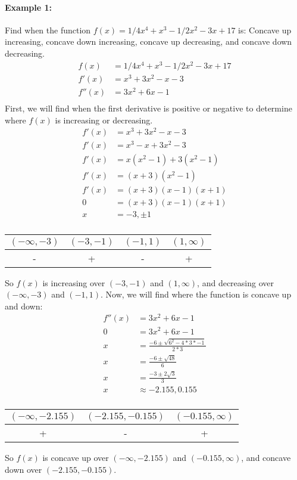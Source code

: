 \documentclass[../revisedmain.tex]{subfiles}
\begin{document}
\paragraph{Example 1:} Find when the function \(f(x)=1/4x^4+x^3-1/2x^2-3x+17\) is: Concave up increasing, concave down increasing, concave up decreasing, and concave down decreasing.
\begin{equation}
	\begin{split}
	f(x)&=1/4x^4+x^3-1/2x^2-3x+17\\
	f'(x)&=x^3+3x^2-x-3\\
	f''(x)&=3x^2+6x-1 \\
	\end{split}
\end{equation}First, we will find when the first derivative is positive or negative to determine where \(f(x)\) is increasing or decreasing.
\begin{equation}
	\begin{split}
	f'(x)&=x^3+3x^2-x-3\\
	f'(x)&=x^3-x+3x^2-3\\
	f'(x)&=x(x^2-1)+3(x^2-1)\\
	f'(x)&=(x+3)(x^2-1)\\
	f'(x)&=(x+3)(x-1)(x+1)\\
	0&=(x+3)(x-1)(x+1)\\
	x&=-3,\pm 1 \\
	\end{split}
\end{equation}
\begin{center}\begin{tabular}{|c|c|c|c|}
	\hline
	\((-\infty ,-3)\) & \((-3,-1)\) &\((-1,1)\) & \((1,\infty)\)\\
	\hline
	-&+&-&+\\
	\hline
\end{tabular}\end{center}
So \(f(x)\) is increasing over \((-3,-1)\) and \((1,\infty)\), and decreasing over \((-\infty,-3)\) and \((-1,1)\). Now, we will find where the function is concave up and down:
\begin{equation}
	\begin{split}
	f''(x)&=3x^2+6x-1\\
	0&=3x^2+6x-1\\
	x&=\frac{-6\pm \sqrt{6^2-4*3*-1}}{2*3}\\
	x&=\frac{-6\pm\sqrt{48}}{6}\\
	x&=\frac{-3\pm 2\sqrt{3}}{3}\\
	x&\approx -2.155, 0.155 \\
	\end{split}
\end{equation}
\begin{center}\begin{tabular}{|c|c|c|}
	\hline
	\((-\infty,-2.155)\) & \((-2.155,-0.155)\) & \((-0.155,\infty)\) \\
	\hline
	+&-&+\\
	\hline
\end{tabular}\end{center}So \(f(x)\) is concave up over \((-\infty,-2.155)\) and \((-0.155,\infty)\), and concave down over \((-2.155,-0.155)\).
\end{document}
